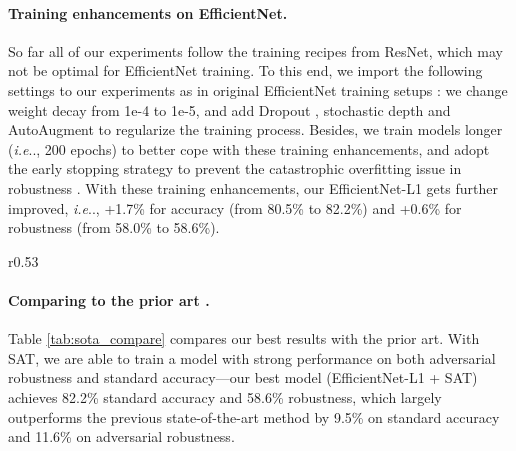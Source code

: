 \documentclass{article}
\makeatletter
\DeclareRobustCommand\onedot{\futurelet\@let@token\@onedot}
\def\@onedot{\ifx\@let@token.\else.\null\fi\xspace}
\def\ie{\emph{i.e}\onedot} \def\Ie{\emph{I.e}\onedot}
\makeatother
\begin{document}
\paragraph{Training enhancements on EfficientNet.} So far all of our experiments follow the training recipes from ResNet, which may not be optimal for EfficientNet training. To this end, we import the following settings to our experiments as in original EfficientNet training setups \cite{Tan2019}: we change weight decay from 1e-4 to 1e-5, and add Dropout \cite{Srivastava2014},  stochastic depth \cite{huang2016deep} and AutoAugment \cite{Cubuk2018} to regularize the training process. Besides, we train models longer (\ie, 200 epochs) to better cope with these training enhancements, and adopt the early stopping strategy to prevent the catastrophic overfitting issue in robustness \cite{wong2020fast}.  With these training enhancements, our EfficientNet-L1 gets further improved, \ie,  +1.7\% for accuracy (from 80.5\% to 82.2\%) and +0.6\% for robustness (from 58.0\% to 58.6\%).

\begin{wrapfigure}{r}{0.53\textwidth}
\centering
\vskip -0.25in
\vskip -0.05in
\label{tab:sota_compare}
\vskip -0.2in
\end{wrapfigure}


\paragraph{Comparing to the prior art \cite{Qin2019}.} Table \ref{tab:sota_compare} compares our best results with the prior art. With SAT, we are able to train a model with strong performance on both adversarial robustness and standard accuracy---our best model (EfficientNet-L1 + SAT) achieves 82.2\% standard accuracy and 58.6\% robustness, which largely outperforms the previous state-of-the-art method \cite{Qin2019} by 9.5\% on standard accuracy and 11.6\% on adversarial robustness.
\end{document}
